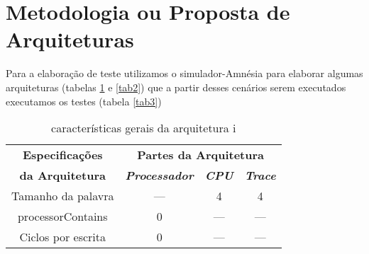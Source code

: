 \section{Metodologia ou Proposta de Arquiteturas}

    Para a elaboração de teste utilizamos o simulador-Amnésia para elaborar algumas
    arquiteturas (tabelas \ref{tab1} e \ref{tab2}) que a partir desses cenários serem executados
    executamos os testes (tabela \ref{tab3})
    \begin{table}[!t]
    \caption{características gerais da arquitetura i}
        \centering
        \begin{tabular}{|c|c|c|c|}
            \hline
            \textbf{Especificações} & \multicolumn{3}{|c|}{\textbf{Partes da Arquitetura}} \\
            \cline{2-4} 
            \textbf{da Arquitetura} & \textbf{\textit{Processador}}& \textbf{\textit{CPU}}& \textbf{\textit{Trace}} \\
            \hline
            Tamanho da palavra & --- & 4 & 4 \\
            \hline
            processorContains & 0 & --- & --- \\
            \hline
            Ciclos por escrita & 0 & --- & --- \\
            \hline
        \end{tabular}
        \label{tab1}
    \end{table}

